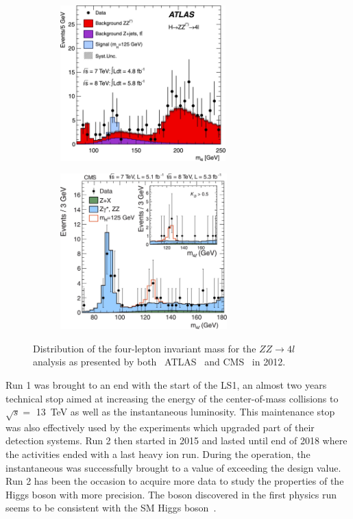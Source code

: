 	\begin{figure}[H]
		\begin{subfigure}{0.5\linewidth}
			\centering
			\includegraphics[height = 6cm]{fig/chapt2/Higgs-ATLAS-ZZ-4l.jpg}
			\caption{\label{fig:Higgs:A}}
		\end{subfigure}
		\begin{subfigure}{0.5\linewidth}
			\centering
			\includegraphics[height = 6cm]{fig/chapt2/Higgs-CMS-ZZ-4l.jpg}
			\caption{\label{fig:Higgs:B}}
		\end{subfigure}
		\caption{\label{fig:Higgs} Distribution of the four-lepton invariant mass for the $ZZ \rightarrow 4l$ analysis as presented by both~ ATLAS~\cite{ATLAS2012} and  CMS~\cite{CMS2012} in 2012.}
	\end{figure}
	
	Run 1 was brought to an end with the start of the \acl{LS1}, an almost two years technical stop aimed at increasing the energy of the center-of-mass collisions to $\sqrt{s} =$ \SI{13}{TeV} as well as the instantaneous luminosity. This maintenance stop was also effectively used by the experiments which upgraded part of their detection systems. Run 2 then started in 2015 and lasted until end of 2018 where the activities ended with a last heavy ion run. During the operation, the instantaneous was successfully brought to a value of \siflux exceeding the design value. Run 2 has been the occasion to acquire more data to study the properties of the Higgs boson with more precision. The boson discovered in the first physics run seems to be consistent with the SM Higgs boson~\cite{HIGGS2015}.
	
